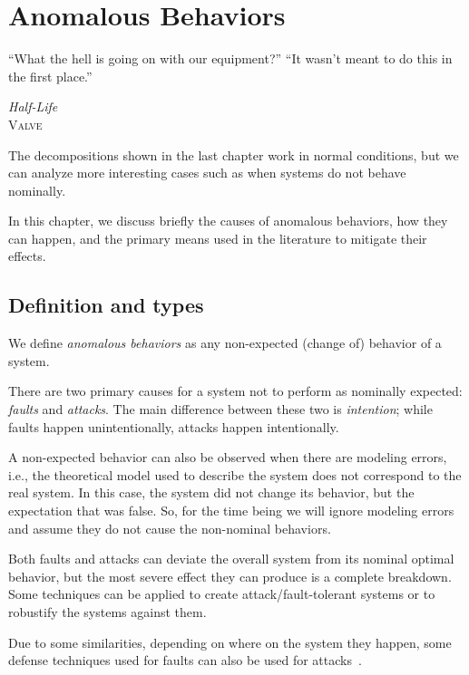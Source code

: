 \documentclass[../main.tex]{subfiles}
\begin{document}
\chapter[Anomalous Behaviors]{Anomalous Behaviors}\label{sec:anomalous}


\epigraph{``What the hell is going on with our equipment?''
``It wasn't meant to do this in the first place.''}
{\textit{Half-Life}\\\textsc{Valve}}

The decompositions shown in the last chapter work in normal conditions, but we can analyze more interesting cases such as when systems do not behave nominally.

In this chapter, we discuss briefly the causes of anomalous behaviors, how they can happen, and the primary means used in the literature to mitigate their effects.

\minitoc%

\section{Definition and types}
We define \emph{anomalous behaviors} as any non-expected (change of) behavior of a system.

There are two primary causes for a system not to perform as nominally expected: \emph{faults} and \emph{attacks}.
The main difference between these two is \emph{intention}; while faults happen unintentionally, attacks happen intentionally.

\begin{remark}
  A non-expected behavior can also be observed when there are modeling errors, i.e., the theoretical model used to describe the system does not correspond to the real system.
  In this case, the system did not change its behavior, but the expectation that was false.
  So, for the time being we will ignore modeling errors and assume they do not cause the non-nominal behaviors.
\end{remark}

Both faults and attacks can deviate the overall system from its nominal optimal behavior, but the most severe effect they can produce is a complete breakdown.
Some techniques can be applied to create attack/fault-tolerant systems or to robustify the systems against them.

Due to some similarities, depending on where on the system they happen, some defense techniques used for faults can also be used for attacks~.
\end{document}
